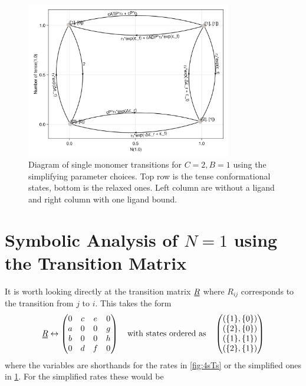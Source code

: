 \documentclass[11pt]{article}
\newcommand\set[1]{\ensuremath{\{#1\}}}
\newcommand{\duf}[2]{\stackunder[0.5pt]{\stackunder[0.8pt]{\stackunder[1pt]{\ensuremath{#1}}{\rule{\widthof{\ensuremath{#2}}*\real{0.9}}{.1ex}}}{\rule{\widthof{\ensuremath{#2}}*\real{0.9}}{.1ex}}}{}}
\newcommand{\du}[1]{\duf{#1}{#1}}
\begin{document}
\begin{figure}[H]
	\centering
	\includegraphics[width=0.8\textwidth]{../../plots/simple_sg_B=1_C=2_N=1_version=2.5.png}
	\caption{
		Diagram of single monomer transitions for $C=2,B=1$ using the simplifying parameter choices.
		Top row is the tense conformational states, bottom is the relaxed ones.
		Left column are without a ligand and right column with one ligand bound.
	}\label{fig:4sTss}
\end{figure}

\newpage
\section{Symbolic Analysis of $N=1$ using the Transition Matrix}
It is worth looking directly at the transition matrix $\du{R}$ where $R_{ij}$ corresponds to the transition from $j$ to $i$.
This takes the form
\begin{equation}\label{eq:Rinvars}
	\du{R} \leftrightarrow \begin{pmatrix}
		0 & c & e & 0 \\
		a & 0 & 0 & g \\
		b & 0 & 0 & h \\
		0 & d & f & 0 \\
	\end{pmatrix} \qq{with states ordered as} \begin{pmatrix}
		(\set{1}, \set{0}) \\
		(\set{2}, \set{0}) \\
		(\set{1}, \set{1}) \\
		(\set{2}, \set{1})
	\end{pmatrix}
\end{equation}
where the variables are shorthands for the rates in \cref{fig:4sTs} or the simplified ones in \cref{fig:4sTss}.
For the simplified rates these would be
\end{document}
